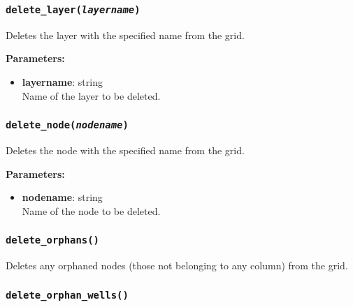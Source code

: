 \begin{snugshade}\subsubsection{\texttt{delete\_layer(\emph{layername})}}\end{snugshade}
\label{sec:mulgrid:delete_layer}

Deletes the layer with the specified name from the grid.

\textbf{Parameters:}
\begin{itemize}
\item \textbf{layername}: string\\
  Name of the layer to be deleted.
\end{itemize}

\begin{snugshade}\subsubsection{\texttt{delete\_node(\emph{nodename})}}\end{snugshade}
\label{sec:mulgrid:delete_node}

Deletes the node with the specified name from the grid.

\textbf{Parameters:}
\begin{itemize}
\item \textbf{nodename}: string\\
  Name of the node to be deleted.
\end{itemize}

\begin{snugshade}\subsubsection{\texttt{delete\_orphans()}}\end{snugshade}
\label{sec:mulgrid:delete_orphans}

Deletes any orphaned nodes (those not belonging to any column) from the grid.

\begin{snugshade}\subsubsection{\texttt{delete\_orphan\_wells()}}\end{snugshade}
\label{sec:mulgrid:delete_orphan_wells}

